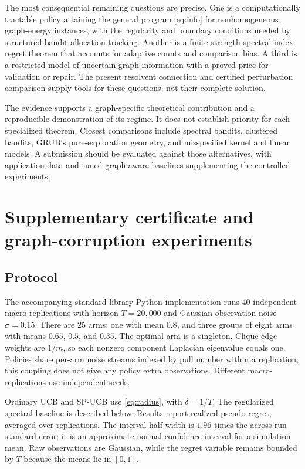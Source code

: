 \documentclass[11pt]{article}
\begin{document}
The most consequential remaining questions are precise. One is a computationally tractable policy attaining the general program \eqref{eq:info} for nonhomogeneous graph-energy instances, with the regularity and boundary conditions needed by structured-bandit allocation tracking. Another is a finite-strength spectral-index regret theorem that accounts for adaptive counts and comparison bias. A third is a restricted model of uncertain graph information with a proved price for validation or repair. The present resolvent connection and certified perturbation comparison supply tools for these questions, not their complete solution.

The evidence supports a graph-specific theoretical contribution and a reproducible demonstration of its regime. It does not establish priority for each specialized theorem. Closest comparisons include spectral bandits, clustered bandits, GRUB's pure-exploration geometry, and misspecified kernel and linear models. A submission should be evaluated against those alternatives, with application data and tuned graph-aware baselines supplementing the controlled experiments.

\appendix
\section{Supplementary certificate and graph-corruption experiments}
\subsection{Protocol}
The accompanying standard-library Python implementation runs 40 independent macro-replications with horizon $T=20{,}000$ and Gaussian observation noise $\sigma=0.15$. There are 25 arms: one with mean $0.8$, and three groups of eight arms with means $0.65$, $0.5$, and $0.35$. The optimal arm is a singleton. Clique edge weights are $1/m$, so each nonzero component Laplacian eigenvalue equals one. Policies share per-arm noise streams indexed by pull number within a replication; this coupling does not give any policy extra observations. Different macro-replications use independent seeds.

Ordinary UCB and SP-UCB use \eqref{eq:radius}, with $\delta=1/T$. The regularized spectral baseline is described below. Results report realized pseudo-regret, averaged over replications. The interval half-width is $1.96$ times the across-run standard error; it is an approximate normal confidence interval for a simulation mean. Raw observations are Gaussian, while the regret variable remains bounded by $T$ because the means lie in $[0,1]$.
\end{document}
